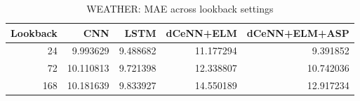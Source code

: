 \begin{table}
\caption{WEATHER: MAE across lookback settings}
\begin{tabular}{rrrrr}
\toprule
Lookback & CNN & LSTM & dCeNN+ELM & dCeNN+ELM+ASP \\
\midrule
24 & 9.993629 & 9.488682 & 11.177294 & 9.391852 \\
72 & 10.110813 & 9.721398 & 12.338807 & 10.742036 \\
168 & 10.181639 & 9.833927 & 14.550189 & 12.917234 \\
\bottomrule
\end{tabular}
\end{table}
